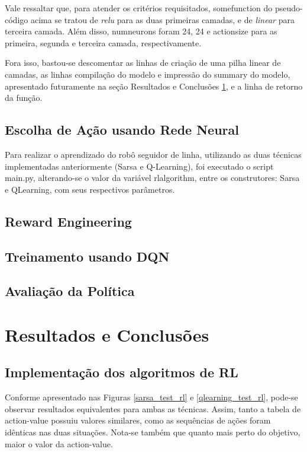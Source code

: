 \documentclass[conference]{IEEEtran}
\begin{document}
	Vale ressaltar que, para atender os critérios requisitados, some\underline{\space}function do pseudo-código acima se tratou de \textit{relu} para as duas primeiras camadas, e de \textit{linear} para terceira camada. Além disso, num\underline{\space}neurons foram 24, 24 e action\underline{\space}size para as primeira, segunda e terceira camada, respectivamente.

	Fora isso, bastou-se descomentar as linhas de criação de uma pilha linear de camadas, as linhas compilação do modelo e impressão do summary do modelo, apresentado futuramente na seção Resultados e Conclusões \ref{results}, e a linha de retorno da função.

	\subsection{Escolha de Ação usando Rede Neural}

Para realizar o aprendizado do robô seguidor de linha, utilizando as duas técnicas implementadas anteriormente (Sarsa e Q-Learning), foi executado o script main.py, alterando-se o valor da variável rl\underline{\space}algorithm, entre os construtores: Sarsa e QLearning, com seus respectivos parâmetros.

		\subsection{Reward Engineering}

		\subsection{Treinamento usando DQN}

		\subsection{Avaliação da Política}

\section{Resultados e Conclusões} \label{results}

	\subsection{Implementação dos algoritmos de RL}

Conforme apresentado nas Figuras \ref{sarsa_test_rl} e \ref{qlearning_test_rl}, pode-se observar resultados equivalentes para ambas as técnicas. Assim, tanto a tabela de action-value possuiu valores similares, como as sequências de ações foram idênticas nas duas situações. Nota-se também que quanto mais perto do objetivo, maior o valor da action-value.
\end{document}
